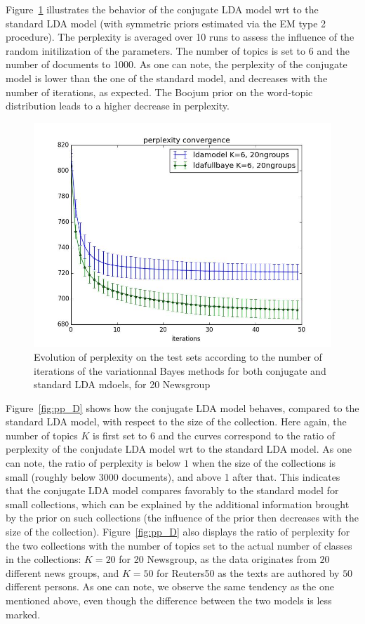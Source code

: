 Figure~\ref{fig:pp_conv} illustrates the behavior of the conjugate LDA model wrt to the standard LDA model (with symmetric priors estimated via the EM type 2 procedure). The perplexity is averaged over 10 runs to assess the influence of the random initilization of the parameters. The number of topics is set to 6 and the number of documents to 1000. As one can note, the perplexity of the conjugate model is lower than the one of the standard model, and decreases with the number of iterations, as expected. The Boojum prior on the word-topic distribution leads to a higher decrease in perplexity.

\begin{figure}[h]
\label{fig:pp_conv}
\includegraphics[scale=0.4]{results/pp_conv}
\caption{Evolution of perplexity on the test sets according to the number of iterations of the variationnal Bayes methods for both conjugate and standard LDA mdoels, for 20 Newsgroup}
\end{figure}


Figure~\ref{fig:pp_D} shows how the conjugate LDA model behaves, compared to the standard LDA model, with respect to the size of the collection. Here again, the number of topics $K$ is first set to $6$ and the curves correspond to the ratio of perplexity of the conjudate LDA model wrt to the standard LDA model. As one can note, the ratio of perplexity is below $1$ when the size of the collections is small (roughly below 3000 documents), and above 1 after that. This indicates that the conjugate LDA model compares favorably to the standard model for small collections, which can be explained by the additional information brought by the prior on such collections (the influence of the prior then decreases with the size of the collection). Figure~\ref{fig:pp_D} also displays the ratio of perplexity for the two collections with the number of topics set to the actual number of classes in the collections: $K=20$ for 20 Newsgroup, as the data originates from $20$ different news groups, and $K=50$ for Reuters50 as the texts are authored by $50$ different persons. As one can note, we observe the same tendency as the one mentioned above, even though the difference between the two models is less marked.

